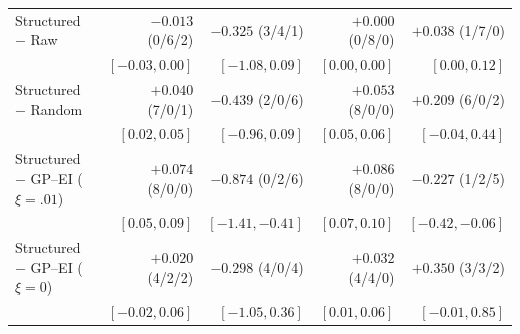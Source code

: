 \begin{table}[htbp]
\begin{tabular*}{\linewidth}{@{\extracolsep{\fill}}lrrrr@{}}
Structured $-$ Raw & $-0.013$ (0/6/2) & $-0.325$ (3/4/1) & $+0.000$ (0/8/0) & $+0.038$ (1/7/0) \\
 & {\scriptsize$[-0.03, 0.00]$} & {\scriptsize$[-1.08, 0.09]$} & {\scriptsize$[0.00, 0.00]$} & {\scriptsize$[0.00, 0.12]$} \\[1pt]
Structured $-$ Random & $+0.040$ (7/0/1) & $-0.439$ (2/0/6) & $+0.053$ (8/0/0) & $+0.209$ (6/0/2) \\
 & {\scriptsize$[0.02, 0.05]$} & {\scriptsize$[-0.96, 0.09]$} & {\scriptsize$[0.05, 0.06]$} & {\scriptsize$[-0.04, 0.44]$} \\[1pt]
Structured $-$ GP--EI ($\xi=.01$) & $+0.074$ (8/0/0) & $-0.874$ (0/2/6) & $+0.086$ (8/0/0) & $-0.227$ (1/2/5) \\
 & {\scriptsize$[0.05, 0.09]$} & {\scriptsize$[-1.41, -0.41]$} & {\scriptsize$[0.07, 0.10]$} & {\scriptsize$[-0.42, -0.06]$} \\[1pt]
Structured $-$ GP--EI ($\xi=0$) & $+0.020$ (4/2/2) & $-0.298$ (4/0/4) & $+0.032$ (4/4/0) & $+0.350$ (3/3/2) \\
 & {\scriptsize$[-0.02, 0.06]$} & {\scriptsize$[-1.05, 0.36]$} & {\scriptsize$[0.01, 0.06]$} & {\scriptsize$[-0.01, 0.85]$} \\[1pt]
\bottomrule
\end{tabular*}
\end{table}
